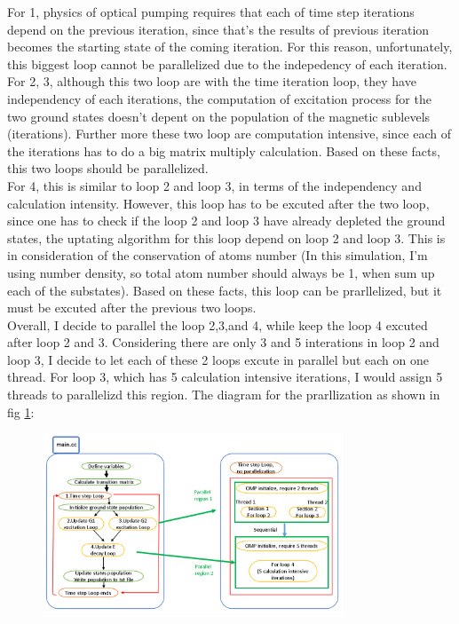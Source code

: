 \documentclass[a4paper, 10pt]{article}
\begin{document}
For 1,  physics of optical pumping requires that each of time step iterations depend on the previous iteration, since that's the results of previous iteration becomes the starting state of the coming iteration. For this reason, unfortunately, this biggest loop cannot be parallelized due to the  indepedency of each iteration.\\

For 2, 3, although this two loop are with the time iteration loop, they have independency of each iterations, the computation of excitation process for the two ground states doesn't depent on the population of the magnetic sublevels (iterations). Further more these two loop are computation intensive, since each of the iterations has to do a big matrix multiply calculation. Based on these facts, this  two loops should be parallelized.\\

For 4, this is similar to loop 2 and loop 3, in terms of the independency and calculation intensity. However, this loop has to be excuted after the two loop, since one has to check if the loop 2 and loop 3 have already depleted the ground states, the uptating algorithm for this loop depend on loop 2 and loop 3. This is in consideration of the conservation of atoms number (In this simulation, I'm using number density, so total atom number should always be 1, when sum up each of the substates). Based on these facts, this loop can be prarllelized, but it must be excuted after the previous two loops.\\

Overall, I decide to parallel the loop 2,3,and 4, while keep the loop 4 excuted after loop 2 and 3. Considering there are only 3 and 5 interations in loop 2 and loop 3, I decide to let each of these 2 loops excute in parallel but each on one thread. For loop 3, which has 5 calculation intensive iterations, I would assign 5 threads to parallelizd this region. The diagram for the prarllization as shown in fig \ref{fig6}: \\

\begin{figure}[h]
  \centering
  \caption{}
  \includegraphics[width = 0.8\textwidth]{fig6}
  \label{fig6}
\end{figure}
\end{document}
